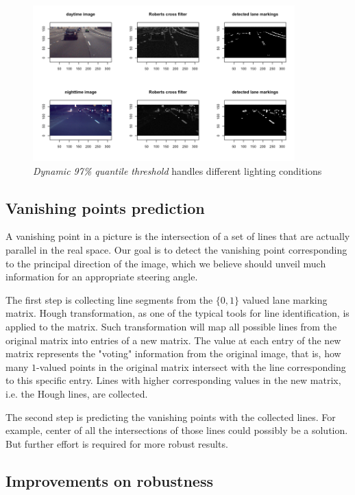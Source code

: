 \documentclass[11pt, oneside]{article}
\begin{document}
\begin{figure}[!ht]
  \centering
      \includegraphics[width=0.9\textwidth]{Rplot1.png} 
  \caption{\textit{Dynamic 97\% quantile threshold} handles different lighting conditions}
\end{figure}


\subsection*{Vanishing points prediction}

A vanishing point in a picture is the intersection of a set of lines that are actually parallel in the real space. Our goal is to detect the vanishing point corresponding to the principal direction of the image, which we believe should unveil much information for an appropriate steering angle.

The first step is collecting line segments from the $\{0, 1\}$ valued lane marking matrix. Hough transformation, as one of the typical tools for line identification, is applied to the matrix. Such transformation will map all possible lines from the original matrix into entries of a new matrix. The value at each entry of the new matrix represents the "voting" information from the original image, that is, how many $1$-valued points in the original matrix intersect with the line corresponding to this specific entry. Lines with higher corresponding values in the new matrix, i.e. the Hough lines, are collected. 

The second step is predicting the vanishing points with the collected lines. For example, center of all the intersections of those lines could possibly be a solution. But further effort is required for more robust results. 

\subsection*{Improvements on robustness}
\end{document}
